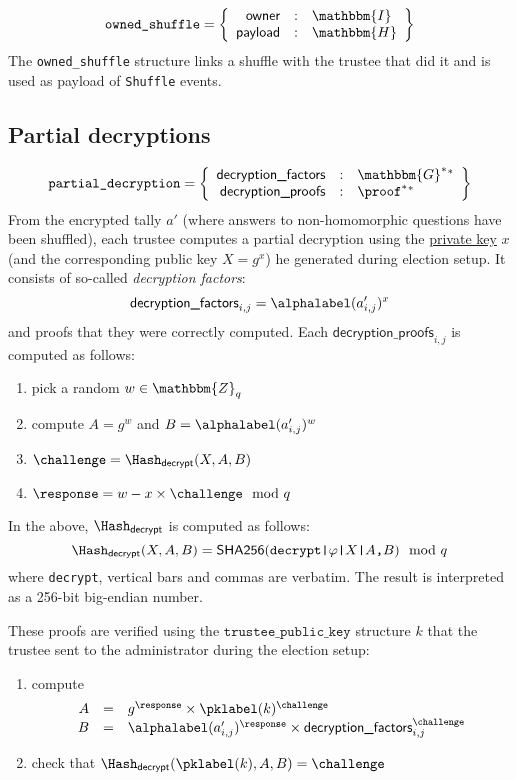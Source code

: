 \documentclass[a4paper]{article}
\newcommand{\G}{\mathbbm{G}}
\newcommand{\Z}{\mathbbm{Z}}
\newcommand{\hash}{\mathbbm{H}}
\newcommand{\I}{\mathbbm{I}}
\newcommand{\shatwo}{\textsf{SHA256}}
\newcommand{\tpk}{\texttt{trustee\_public\_key}}
\newcommand{\pdecryption}{\texttt{partial\_decryption}}
\begin{document}
\begin{gather*}
  \texttt{owned\_shuffle}=\left\{
    \begin{array}{rcl}
      \textsf{owner}&:&\I\\
      \textsf{payload}&:&\hash
    \end{array}
  \right\}
\end{gather*}
The \texttt{owned\_shuffle} structure links a shuffle with the trustee
that did it and is used as payload of \texttt{Shuffle} events.

\subsection{Partial decryptions}
\label{partial-decryptions}

\newcommand{\dfactors}{\textsf{decryption\_factors}}
\newcommand{\dproofs}{\textsf{decryption\_proofs}}
\newcommand{\decrypt}{\textsf{decrypt}}

\begin{gather*}
  \pdecryption=\left\{
    \begin{array}{rcl}
      \dfactors&:&\G^\ast{}^\ast\\
      \dproofs&:&\proof^\ast{}^\ast
    \end{array}
  \right\}
\end{gather*}
From the encrypted tally $a'$ (where answers to non-homomorphic questions
have been shuffled), each trustee computes a partial decryption using
the \hyperref[trustee-keys]{private key} $x$ (and the corresponding
public key $X=g^x$) he generated during election setup. It consists of
so-called \emph{decryption factors}:
\[
\dfactors_{i,j}=\alphalabel(a'_{i,j})^x
\]
and proofs that they were correctly computed. Each $\dproofs_{i,j}$ is
computed as follows:
\begin{enumerate}
\item pick a random $w\in\Z_q$
\item compute $A=g^w$ and $B=\alphalabel(a'_{i,j})^w$
\item $\challenge=\Hash_\decrypt(X,A,B)$
\item $\response=w-x\times\challenge\mod q$
\end{enumerate}
In the above, $\Hash_\decrypt$ is computed as follows:
\[
\Hash_\decrypt(X,A,B)=\shatwo(\verb=decrypt|=\varphi\verb=|=X\verb=|=A\verb=,=B)\mod q
\]
where \verb=decrypt=, vertical bars and commas are verbatim.
The result is interpreted as a 256-bit big-endian number.

These proofs are verified using the $\tpk$ structure $k$ that the
trustee sent to the administrator during the election setup:
\begin{enumerate}
\item compute
\[
\begin{array}{rcl}
A&=&{g^\response}\times{\pklabel(k)^\challenge}\\
B&=&{\alphalabel(a'_{i,j})^\response}\times{\dfactors_{i,j}^\challenge}
\end{array}
\]
\item check that $\Hash_\decrypt(\pklabel(k),A,B)=\challenge$
\end{enumerate}
\end{document}
